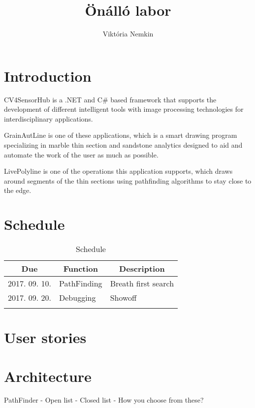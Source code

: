 \documentclass[11pt,oneside]{article}
\author{Viktória Nemkin}
\title{Önálló labor}
\begin{document}
\maketitle
\newpage
\tableofcontents
\newpage

\section{Introduction}

CV4SensorHub is a .NET and C\# based framework that supports the development of different intelligent tools with image processing technologies for interdisciplinary applications.

GrainAutLine is one of these applications, which is a smart drawing program specializing in marble thin section and sandstone analytics designed to aid and automate the work of the user as much as possible.

LivePolyline is one of the operations this application supports, which draws around segments of the thin sections using pathfinding algorithms to stay close to the edge.

\section{Schedule}

\begin{table}[H]
\centering
\caption{Schedule} \vspace{0.1cm}
\label{schedule}
\begin{tabular}{@{}lll@{}}
\toprule

\multicolumn{1}{c}{\textbf{Due}} &
\multicolumn{1}{c}{\textbf{Function}} &
\multicolumn{1}{c}{\textbf{Description}} \\

\midrule

\multicolumn{1}{|l|}{2017. 09. 10.} &
\multicolumn{1}{l|}{PathFinding} &
\multicolumn{1}{l|}{Breath first search} \\

\multicolumn{1}{|l|}{2017. 09. 20.} & 
\multicolumn{1}{l|}{Debugging} & 
\multicolumn{1}{l|}{Showoff} \\

&& \\

\bottomrule

\end{tabular}
\end{table}

\section{User stories}


\section{Architecture}


PathFinder
- Open list
- Closed list
- How you choose from these?
\end{document}
